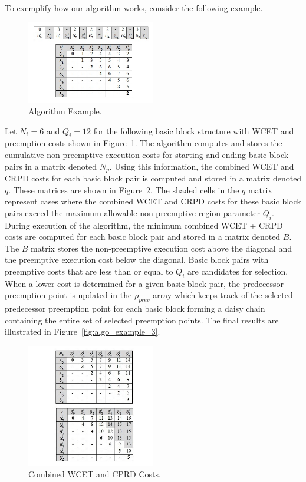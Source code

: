 To exemplify how our algorithm works, consider the following example. 
\begin{figure}[h!]
\begin{center}
\includegraphics[width=0.5\textwidth]{algo_example.jpg}
\caption{Algorithm Example.}
\label{fig:algo_example}
\end{center}
\end{figure}
Let $N_i=6$ and $Q_i=12$ for the following basic block structure with WCET and preemption costs shown in Figure~\ref{fig:algo_example}.  The algorithm computes and stores the cumulative non-preemptive execution costs for starting and ending basic block pairs in a matrix denoted $N_p$.  Using this information, the combined WCET and CRPD costs for each basic block pair is computed and stored in a matrix denoted $q$.  These matrices are shown in Figure~\ref{fig:algo_example_2}.  The shaded cells in the $q$ matrix represent cases where the combined WCET and CRPD costs for these basic block pairs exceed the maximum allowable non-preemptive region parameter $Q_i$.  During execution of the algorithm, the minimum combined WCET + CRPD costs are computed for each basic block pair and stored in a matrix denoted $B$.  The $B$ matrix stores the non-preemptive execution cost above the diagonal and the preemptive execution cost below the diagonal.  Basic block pairs with preemptive costs that are less than or equal to $Q_i$ are candidates for selection.  When a lower cost is determined for a given basic block pair, the predecessor preemption point is updated in the $\rho_{prev}$ array which keeps track of the selected predecessor preemption point for each basic block forming a daisy chain containing the entire set of selected preemption points.  The final results are illustrated in Figure~\ref{fig:algo_example_3}.
\begin{figure}[h!]
\begin{center}
\includegraphics[width=0.5\textwidth]{algo_example_2.jpg}
\caption{Combined WCET and CPRD Costs.}
\label{fig:algo_example_2}
\end{center}
\end{figure}
